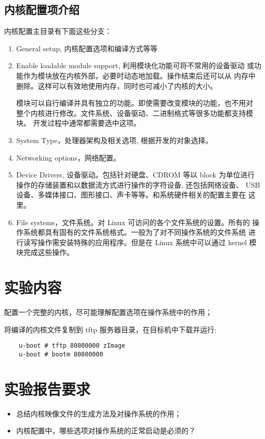 \subsection{内核配置项介绍}
	内核配置主目录有下面这些分支：
\begin{enumerate}
  \item General setup, 内核配置选项和编译方式等等
  \item Enable loadable module support, 利用模块化功能可将不常用的设备驱动
		或功能作为模块放在内核外部，必要时动态地加载。操作结束后还可以从
		内存中删除。这样可以有效地使用内存，同时也可减小了内核的大小。

		模块可以自行编译并具有独立的功能。即使需要改变模块的功能，也不用对
		整个内核进行修改。文件系统、设备驱动、二进制格式等很多功能都支持模块。
		开发过程中通常都需要选中这项。
  \item System Type，处理器架构及相关选项, 根据开发的对象选择。
  \item Networking options，网络配置。
  \item Device Drivers, 设备驱动。包括针对硬盘、CDROM 等以 block 为单位进行
		操作的存储装置和以数据流方式进行操作的字符设备, 还包括网络设备、
		USB设备、多媒体接口、图形接口、声卡等等。和系统硬件相关的配置主要在
		这里。
  \item File systems，文件系统。对 Linux 可访问的各个文件系统的设置。所有的
		操作系统都具有固有的文件系统格式。一般为了对不同操作系统的文件系统
		进行读写操作需安装特殊的应用程序。但是在 Linux 系统中可以通过
		kernel 模块完成这些操作。
\end{enumerate}

\section{实验内容}
	配置一个完整的内核，尽可能理解配置选项在操作系统中的作用；

	将编译的内核文件复制到 tftp 服务器目录，在目标机中下载并运行:

\begin{boxedminipage}{.9\textwidth}
\begin{verbatim}
	u-boot # tftp 80800000 zImage
	u-boot # bootm 80800000
\end{verbatim}
\end{boxedminipage}

\section{实验报告要求}
\begin{itemize}
  \item 总结内核映像文件的生成方法及对操作系统的作用；
  \item 内核配置中，哪些选项对操作系统的正常启动是必须的？
\end{itemize}

